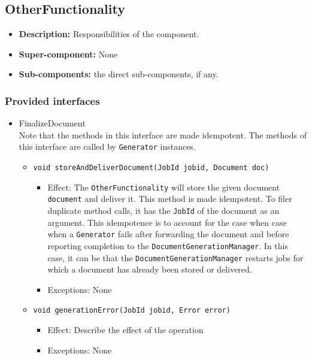 \documentclass[a4paper,10pt]{article}
\begin{document}
\subsection{OtherFunctionality}
\begin{itemize}
    \item \textbf{Description:} Responsibilities of the component.
    \item \textbf{Super-component:} None
    \item \textbf{Sub-components:} the direct sub-components, if any.
\end{itemize}

\subsubsection*{Provided interfaces}
\begin{itemize}
    \item FinalizeDocument\\
    Note that the methods in this interface are made idempotent. The methods of this interface are called by \texttt{Generator} instances. 
    \begin{itemize}
    
        \item \texttt{void storeAndDeliverDocument(JobId jobid, Document doc)}
        \begin{itemize}
            \item Effect: The \texttt{OtherFunctionality} will store the given document \texttt{document} and deliver it. This method is made idempotent. To filer duplicate method calls, it has the \texttt{JobId} of the document as an argument. This idempotence is to account for the case when case when a \texttt{Generator} fails after forwarding the document and before reporting completion to the \texttt{DocumentGenerationManager}. In this case, it can be that the \texttt{DocumentGenerationManager} restarts jobs for which a document has already been stored or delivered.
            \item Exceptions: None
		\end{itemize}
		
        \item \texttt{void generationError(JobId jobid, Error error)}
        \begin{itemize}
            \item Effect: Describe the effect of the operation
            \item Exceptions: None
        \end{itemize}
    \end{itemize}


\end{itemize}
\end{document}

